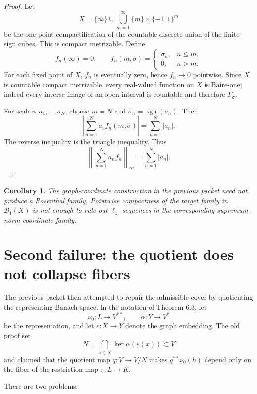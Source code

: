\documentclass[11pt]{article}
\newtheorem{corollary}[theorem]{Corollary}
\newcommand{\Baire}{\mathcal B_1}
\begin{document}
\begin{proof}
Let
\[
  X=\{\infty\}\cup\bigcup_{m=1}^\infty \{m\}\times\{-1,1\}^m
\]
be the one-point compactification of the countable discrete union of the
finite sign cubes.  This is compact metrizable.  Define
\[
  f_n(\infty)=0,\qquad
  f_n(m,\sigma)=
  \begin{cases}
  \sigma_n,& n\le m,\\
  0,& n>m .
  \end{cases}
\]
For each fixed point of \(X\), \(f_n\) is eventually zero, hence \(f_n\to0\)
pointwise.  Since \(X\) is countable compact metrizable, every real-valued
function on \(X\) is Baire-one; indeed every inverse image of an open interval
is countable and therefore \(F_\sigma\).

For scalars \(a_1,\ldots,a_N\), choose \(m=N\) and
\(\sigma_n=\operatorname{sgn}(a_n)\).  Then
\[
 \left|\sum_{n=1}^N a_n f_n(m,\sigma)\right|
 =\sum_{n=1}^N |a_n|.
\]
The reverse inequality is the triangle inequality.  Thus
\[
  \left\|\sum_{n=1}^N a_n f_n\right\|_\infty
  =\sum_{n=1}^N |a_n|.
\]
\end{proof}

\begin{corollary}
The graph-coordinate construction in the previous packet need not produce a
Rosenthal family.  Pointwise compactness of the target family in
\(\Baire(X)\) is not enough to rule out \(\ell_1\)-sequences in the
corresponding supremum-norm coordinate family.
\end{corollary}

\section{Second failure: the quotient does not collapse fibers}
\label{sec:quotientfailure}

The previous packet then attempted to repair the admissible cover by quotienting
the representing Banach space.  In the notation of Theorem 6.3, let
\[
  \nu_0:L\to V^{**},\qquad \alpha:Y\to V^*
\]
be the representation, and let \(e:X\to Y\) denote the graph embedding.  The
old proof set
\[
  N=\bigcap_{x\in X}\ker \alpha(e(x))\subset V
\]
and claimed that the quotient map \(q:V\to V/N\) makes
\(q^{**}\nu_0(h)\) depend only on the fiber of the restriction map
\(\pi:L\to K\).

There are two problems.
\end{document}
